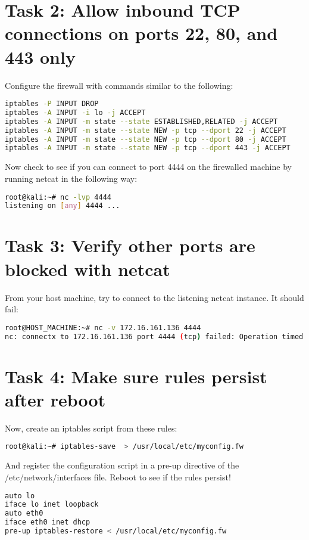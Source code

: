 \documentclass{article}
\begin{document}
\section{Task 2: Allow inbound TCP connections on ports 22, 80, and 443 only}
Configure the firewall with commands similar to the following:
\begin{lstlisting}[language=bash]
iptables -P INPUT DROP
iptables -A INPUT -i lo -j ACCEPT
iptables -A INPUT -m state --state ESTABLISHED,RELATED -j ACCEPT
iptables -A INPUT -m state --state NEW -p tcp --dport 22 -j ACCEPT
iptables -A INPUT -m state --state NEW -p tcp --dport 80 -j ACCEPT
iptables -A INPUT -m state --state NEW -p tcp --dport 443 -j ACCEPT
\end{lstlisting}
Now check to see if you can connect to port 4444 on the firewalled machine by running netcat in the following way:
\begin{lstlisting}[language=bash]
root@kali:~# nc -lvp 4444
listening on [any] 4444 ...
\end{lstlisting}
\section{Task 3: Verify other ports are blocked with netcat}
From your host machine, try to connect to the listening netcat instance. It should fail:
\begin{lstlisting}[language=bash]
root@HOST_MACHINE:~# nc -v 172.16.161.136 4444
nc: connectx to 172.16.161.136 port 4444 (tcp) failed: Operation timed out
\end{lstlisting}
\section{Task 4: Make sure rules persist after reboot}
Now, create an iptables script from these rules:
\begin{lstlisting}[language=bash]
root@kali:~# iptables-save  > /usr/local/etc/myconfig.fw
\end{lstlisting}
And register the configuration script in a pre-up directive of the /etc/network/interfaces file. Reboot to see if the rules persist!
\begin{lstlisting}[language=bash]
auto lo
iface lo inet loopback
auto eth0
iface eth0 inet dhcp
pre-up iptables-restore < /usr/local/etc/myconfig.fw
\end{lstlisting}
\end{document}
